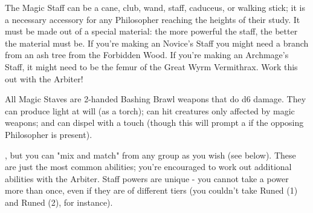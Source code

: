 




The Magic Staff can be a cane, club, wand, staff, caduceus, or walking stick; it is a necessary accessory for any Philosopher reaching the heights of their study. It must be made out of a special material: the more powerful the staff, the better the material must be.  If you're making an Novice's Staff you might need a branch from an ash tree from the Forbidden Wood.  If you're making an Archmage's Staff, it might need to be the femur of the Great Wyrm Vermithrax.  Work this out with the Arbiter!

All Magic Staves are 2-handed \DEX Bashing Brawl weapons that do d6 damage.  They can produce light at will (as a torch); can hit creatures only affected by magic weapons; and can dispel  with a touch (though this will prompt a  if the opposing Philosopher is present).

, but you can "mix and match" from any group as you wish (see below). These are just the most common abilities; you're encouraged to work out additional abilities with the Arbiter. Staff powers are unique - you cannot take a power more than once, even if they are of different tiers (you couldn't take Runed (1) and Runed (2), for instance).




